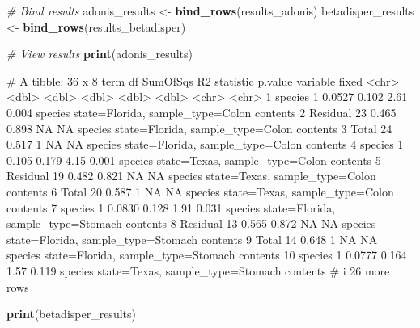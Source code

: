 \documentclass[
]{book}
\newenvironment{Shaded}{\begin{snugshade}}{\end{snugshade}}
\newcommand{\CommentTok}[1]{\textcolor[rgb]{0.56,0.35,0.01}{\textit{#1}}}
\newcommand{\FunctionTok}[1]{\textcolor[rgb]{0.13,0.29,0.53}{\textbf{#1}}}
\newcommand{\NormalTok}[1]{#1}
\newcommand{\OtherTok}[1]{\textcolor[rgb]{0.56,0.35,0.01}{#1}}
\begin{document}
\begin{Shaded}
\begin{Highlighting}[]
\CommentTok{\# Bind results}
\NormalTok{adonis\_results }\OtherTok{\textless{}{-}} \FunctionTok{bind\_rows}\NormalTok{(results\_adonis)}
\NormalTok{betadisper\_results }\OtherTok{\textless{}{-}} \FunctionTok{bind\_rows}\NormalTok{(results\_betadisper)}

\CommentTok{\# View results}
\FunctionTok{print}\NormalTok{(adonis\_results)}
\end{Highlighting}
\end{Shaded}

\begin{Shaded}
\begin{Highlighting}[]
\NormalTok{\# A tibble: 36 x 8}
\NormalTok{   term        df SumOfSqs    R2 statistic p.value variable fixed                                      }
\NormalTok{   \textless{}chr\textgreater{}    \textless{}dbl\textgreater{}    \textless{}dbl\textgreater{} \textless{}dbl\textgreater{}     \textless{}dbl\textgreater{}   \textless{}dbl\textgreater{} \textless{}chr\textgreater{}    \textless{}chr\textgreater{}                                      }
\NormalTok{ 1 species      1   0.0527 0.102      2.61   0.004 species  state=Florida, sample\_type=Colon contents  }
\NormalTok{ 2 Residual    23   0.465  0.898     NA     NA     species  state=Florida, sample\_type=Colon contents  }
\NormalTok{ 3 Total       24   0.517  1         NA     NA     species  state=Florida, sample\_type=Colon contents  }
\NormalTok{ 4 species      1   0.105  0.179      4.15   0.001 species  state=Texas, sample\_type=Colon contents    }
\NormalTok{ 5 Residual    19   0.482  0.821     NA     NA     species  state=Texas, sample\_type=Colon contents    }
\NormalTok{ 6 Total       20   0.587  1         NA     NA     species  state=Texas, sample\_type=Colon contents    }
\NormalTok{ 7 species      1   0.0830 0.128      1.91   0.031 species  state=Florida, sample\_type=Stomach contents}
\NormalTok{ 8 Residual    13   0.565  0.872     NA     NA     species  state=Florida, sample\_type=Stomach contents}
\NormalTok{ 9 Total       14   0.648  1         NA     NA     species  state=Florida, sample\_type=Stomach contents}
\NormalTok{10 species      1   0.0777 0.164      1.57   0.119 species  state=Texas, sample\_type=Stomach contents  }
\NormalTok{\# i 26 more rows}
\end{Highlighting}
\end{Shaded}

\begin{Shaded}
\begin{Highlighting}[]
\FunctionTok{print}\NormalTok{(betadisper\_results)}
\end{Highlighting}
\end{Shaded}
\end{document}
